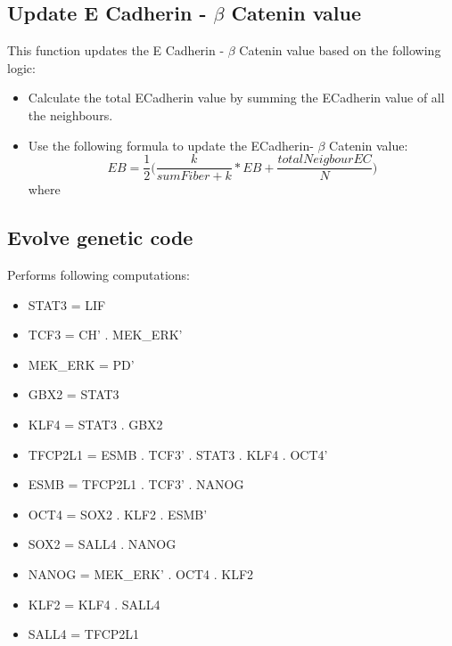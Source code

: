 \documentclass[11pt]{report}
\begin{document}
  \subsection{\color{blue}Update E Cadherin - $ \beta $ Catenin value}
  This function updates the E Cadherin - $ \beta $ Catenin value based on the following logic:
  \begin{itemize}
   \item Calculate the total ECadherin value by summing the ECadherin value of all the neighbours.
   \item Use the following formula to update the ECadherin- $\beta$ Catenin value:\\
   \begin{equation}
    EB = \frac{1}{2}\bigg(\frac{k}{sumFiber+k}*EB + \frac{totalNeigbourEC}{N}\bigg)
   \end{equation}
   where
   \end{itemize}
   \subsection{\color{blue}Evolve genetic code}
   Performs following computations: 
   \begin{itemize}
    \item STAT3 	= 	LIF
    \item TCF3 		= 	CH' . MEK{\_}ERK'
    \item MEK{\_}ERK 	= 	PD'
    \item GBX2		=	STAT3
    \item KLF4		=	STAT3 . GBX2
    \item TFCP2L1	=	ESMB . TCF3' . STAT3 . KLF4 . OCT4'
    \item ESMB		=	TFCP2L1 . TCF3' . NANOG
    \item OCT4		=	SOX2 . KLF2 . ESMB'
    \item SOX2		=	SALL4 . NANOG
    \item NANOG		=	MEK{\_}ERK' . OCT4 . KLF2
    \item KLF2		=	KLF4 . SALL4
    \item SALL4		=	TFCP2L1
   \end{itemize}
\end{document}
